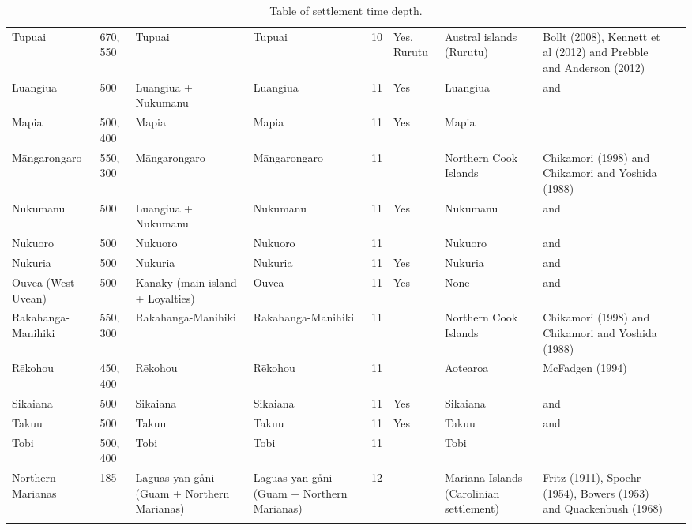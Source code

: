 \begin{longtable}{p{2cm}p{2cm}p{2cm}p{2cm}p{2cm}p{2cm}p{2cm}p{2cm}p{2cm}}
  Tupuai & 670, 550 & Tupuai & Tupuai & 10 & Yes, Rurutu & Austral islands (Rurutu) & Bollt (2008), Kennett et al (2012) and Prebble and Anderson (2012) & \citet{rieth_cochrane_2018} \\ 
  Luangiua & 500 & Luangiua + Nukumanu & Luangiua & 11 & Yes & Luangiua & \citet{kirch2012basline} and \citet{carson2012recent} &  \\ 
  Mapia & 500, 400 & Mapia & Mapia & 11 & Yes & Mapia & \citet{intoh2007reconnaissance} &  \\ 
  Māngarongaro & 550, 300 & Māngarongaro & Māngarongaro & 11 &  & Northern Cook Islands & Chikamori (1998) and Chikamori and Yoshida (1988) & \citet{rieth_cochrane_2018} \\ 
  Nukumanu & 500 & Luangiua + Nukumanu & Nukumanu & 11 & Yes & Nukumanu & \citet{kirch2012basline} and \citet{carson2012recent} &  \\ 
  Nukuoro & 500 & Nukuoro & Nukuoro & 11 &  & Nukuoro & \citet{kirch2012basline} and \citet{carson2012recent} &  \\ 
  Nukuria & 500 & Nukuria & Nukuria & 11 & Yes & Nukuria & \citet{kirch2012basline} and \citet{carson2012recent} &  \\ 
  Ouvea (West Uvean) & 500 & Kanaky (main island + Loyalties) & Ouvea & 11 & Yes & None & \citet{kirch2012basline} and \citet{carson2012recent} &  \\ 
  Rakahanga-Manihiki & 550, 300 & Rakahanga-Manihiki & Rakahanga-Manihiki & 11 &  & Northern Cook Islands & Chikamori (1998) and Chikamori and Yoshida (1988) & \citet{rieth_cochrane_2018} \\ 
  Rēkohou & 450, 400 & Rēkohou & Rēkohou & 11 &  & Aotearoa & McFadgen (1994) & \citet{rieth_cochrane_2018} \\ 
  Sikaiana & 500 & Sikaiana & Sikaiana & 11 & Yes & Sikaiana & \citet{kirch2012basline} and \citet{carson2012recent} &  \\ 
  Takuu & 500 & Takuu & Takuu & 11 & Yes & Takuu & \citet{kirch2012basline} and \citet{carson2012recent} &  \\ 
  Tobi & 500, 400 & Tobi & Tobi & 11 &  & Tobi & \citet{intoh2007reconnaissance} &  \\ 
  Northern Marianas & 185 & Laguas yan gåni (Guam + Northern Marianas) & Laguas yan gåni (Guam + Northern Marianas) & 12 &  & Mariana Islands (Carolinian settlement) & Fritz (1911), Spoehr (1954), Bowers (1953) and Quackenbush (1968) & \citet{ellis2012saipan} \\ 
   \bottomrule
\caption{Table of settlement time depth.} 
\label{appendix_dates_xtable}
\end{longtable}
